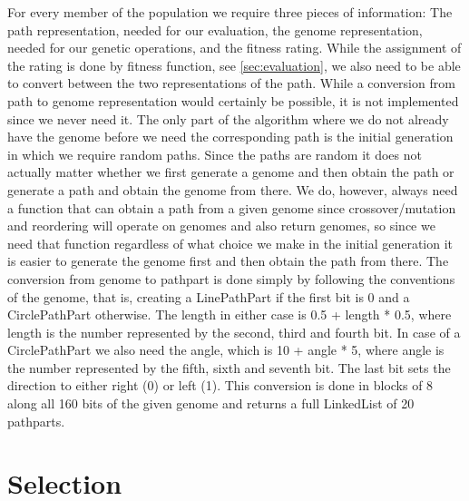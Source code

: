 For every member of the population we require three pieces of information: The path representation, needed for our evaluation, the genome representation, needed for our genetic operations, and the fitness rating. While the assignment of the rating is done by fitness function, see \ref{sec:evaluation}, we also need to be able to convert between the two representations of the path. While a conversion from path to genome representation would certainly be possible, it is not implemented since we never need it. The only part of the algorithm where we do not already have the genome before we need the corresponding path is the initial generation in which we require random paths. Since the paths are random it does not actually matter whether we first generate a genome and then obtain the path or generate a path and obtain the genome from there. We do, however, always need a function that can obtain a path from a given genome since crossover/mutation and reordering will operate on genomes and also return genomes, so since we need that function regardless of what choice we make in the initial generation it is easier to generate the genome first and then obtain the path from there.
The conversion from genome to pathpart is done simply by following the conventions of the genome, that is, creating a LinePathPart if the first bit is 0 and a CirclePathPart otherwise. The length in either case is 0.5 + length * 0.5, where length is the number represented by the second, third and fourth bit.
In case of a CirclePathPart we also need the angle, which is 10 + angle * 5, where angle is the number represented by the fifth, sixth and seventh bit. The last bit sets the direction to either right (0) or left (1).
This conversion is done in blocks of 8 along all 160 bits of the given genome and returns a full LinkedList of 20 pathparts.

\section{Selection} %
\label{sec:selection}

